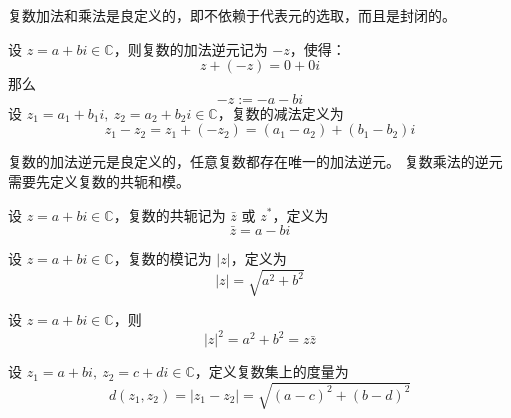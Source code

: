 \begin{note}
    复数加法和乘法是良定义的，即不依赖于代表元的选取，而且是封闭的。
\end{note}
\vspace{1em}

\begin{definition}[复数的加法逆元与减法]
    设 $z=a+bi\in\mathbb{C}$，则复数的加法逆元记为 $-z$，使得：
    \[
        z + (-z) = 0 + 0i
    \]
    那么
    \[
        -z := -a - bi
    \]
    设 $z_1=a_1+b_1i,\ z_2=a_2+b_2i\in\mathbb{C}$，复数的减法定义为
    \[
        z_1 - z_2 = z_1 + (-z_2) = (a_1 - a_2) + (b_1 - b_2)i
    \]
\end{definition}

\begin{note}
    复数的加法逆元是良定义的，任意复数都存在唯一的加法逆元。
    复数乘法的逆元需要先定义复数的共轭和模。
\end{note}
\vspace{1em}

\begin{definition}
    设 $z=a+bi\in\mathbb{C}$，复数的共轭记为 $\bar{z}$ 或 $z^*$，定义为
    \[
        \bar{z} = a - bi
    \]
\end{definition}

\begin{definition}
    设 $z=a+bi\in\mathbb{C}$，复数的模记为 $|z|$，定义为
    \[
        |z| = \sqrt{a^2 + b^2}
    \]
\end{definition}

\begin{proposition}[复数的模与共轭的关系]
    设 $z=a+bi\in\mathbb{C}$，则
    \[
        |z|^2 = a^2 + b^2 = z \bar{z}
    \]
\end{proposition}

\begin{definition}
    设 $z_1=a+bi,\ z_2=c+di\in\mathbb{C}$，定义复数集上的度量为
    \[
        d(z_1,z_2) = |z_1 - z_2| = \sqrt{(a-c)^2 + (b-d)^2}
    \]
\end{definition}

